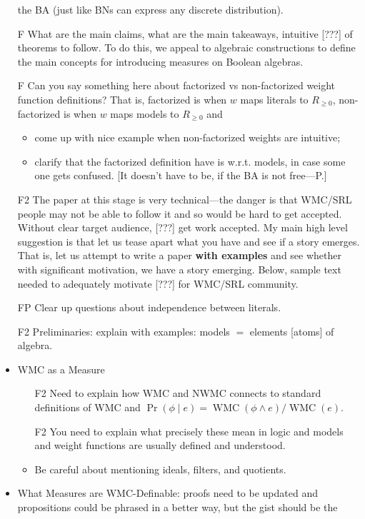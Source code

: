 \documentclass{article}
\theoremstyle{definition}
\theoremstyle{remark}
\DeclareMathOperator{\WMC}{WMC}
\begin{document}
\begin{itemize}
  the BA (just like BNs can express any discrete distribution).
\item[F] What are the main claims, what are the main takeaways, intuitive [???]
  of theorems to follow. To do this, we appeal to algebraic constructions to
  define the main concepts for introducing measures on Boolean algebras.
\item[F] Can you say something here about factorized vs non-factorized
  weight function definitions? That is, factorized is when $w$ maps literals to
  $R_{\ge 0}$, non-factorized is when $w$ maps models to $R_{\ge 0}$ and
  \begin{itemize}
  \item come up with nice example when non-factorized weights are intuitive;
  \item clarify that the factorized definition have is w.r.t. models, in case some
    one gets confused. [It doesn't have to be, if the BA is not free---P.]
  \end{itemize}
\item[F2] The paper at this stage is very technical---the danger is that WMC/SRL
  people may not be able to follow it and so would be hard to get accepted.
  Without clear target audience, [???] get work accepted. My main high level
  suggestion is that let us tease apart what you have and see if a story
  emerges. That is, let us attempt to write a paper {\bf with examples} and
  see whether with significant motivation, we have a story emerging. Below,
  sample text needed to adequately motivate [???] for WMC/SRL community.
\item[FP] Clear up questions about independence between literals.
\item[F2] Preliminaries: explain with examples: models $=$ elements [atoms] of
  algebra.
\item WMC as a Measure
  \begin{itemize}
  \item[F2] Need to explain how WMC and NWMC connects to standard definitions of
    WMC and $\Pr(\phi \mid e) = \WMC(\phi \land e)/\WMC(e)$.
  \item[F2] You need to explain what precisely these mean in logic and models
    and weight functions are usually defined and understood.
  \item Be careful about mentioning ideals, filters, and quotients.
  \end{itemize}
\item What Measures are WMC-Definable: proofs need to be updated and
  propositions could be phrased in a better way, but the gist should be the

\end{itemize}
\end{document}
